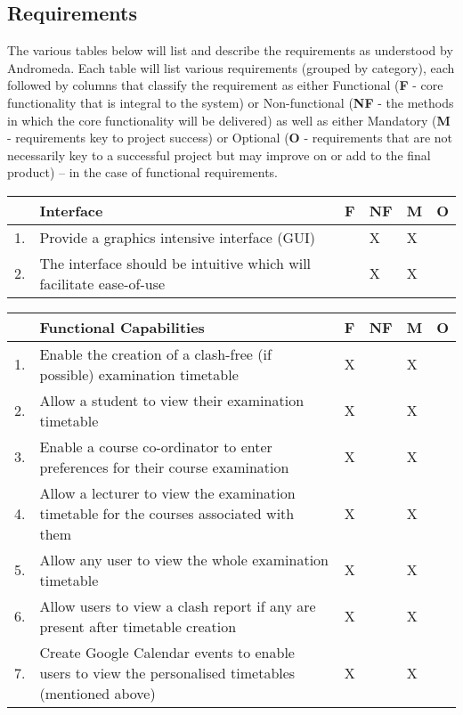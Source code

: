 \documentclass{article}
\begin{document}
\subsection{Requirements}

The various tables below will list and describe the requirements as understood by Andromeda. Each table will list various requirements (grouped by category), each followed by columns that classify the requirement as either Functional (\textbf{F} - core functionality that is integral to the system) or Non-functional (\textbf{NF} - the methods in which the core functionality will be delivered) as well as either Mandatory (\textbf{M} - requirements key to project success) or Optional (\textbf{O} - requirements that are not necessarily key to a successful project but may improve on or add to the final product) – in the case of functional requirements.

\begin{center}
\begin{tabular}{|m{1cm}|m{10cm}|m{1cm}|m{1cm}|m{1cm}|m{1cm}|}
\hline
 & \textbf{Interface} & \textbf{F} & \textbf{NF} & \textbf{M} & \textbf{O} \\
\hline
1. & {Provide a graphics intensive interface (GUI)} & & X & X & \\
\hline
2. & {The interface should be intuitive which will facilitate ease-of-use} & & X & X & \\

\hline
\end{tabular}
\end{center}

\begin{center}
\begin{tabular}{|m{1cm}|m{10cm}|m{1cm}|m{1cm}|m{1cm}|m{1cm}|}
\hline
 & \textbf{Functional Capabilities} & \textbf{F} & \textbf{NF} & \textbf{M} & \textbf{O} \\
\hline
1. & {Enable the creation of a clash-free (if possible) examination timetable} & X & & X & \\
\hline
2. & {Allow a student to view their examination timetable} & X & & X & \\
\hline
3. & {Enable a course co-ordinator to enter preferences for their course examination} & X & & X & \\
\hline
4. & {Allow a lecturer to view the examination timetable for the courses associated with them} & X & & X & \\
\hline
5. & {Allow any user to view the whole examination timetable} & X & & X & \\
\hline
6. & {Allow users to view a clash report if any are present after timetable creation} & X & & X & \\
\hline
7. & {Create Google Calendar events to enable users to view the personalised timetables (mentioned above)} & X & & X & \\
\hline
\end{tabular}
\end{center}
\end{document}
